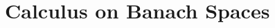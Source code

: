 \documentclass[final]{nddiss2e}
\begin{document}
\tableofcontents




\mainmatter

\appendix
\chapter{Calculus on Banach Spaces}


\backmatter              %

% 

\end{document}
